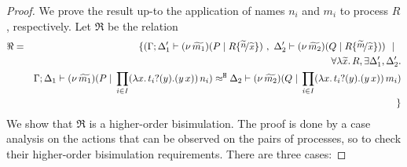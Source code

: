 \begin{proof}
	We prove the result up-to the application
	of names $n_i$ and $m_i$
	to process $R$, respectively.
	Let $\Re$ be the relation
	\begin{eqnarray*}
		\Re	&=&	\set{	(\horel{\Gamma}{\Delta_1'}{\newsp{\widetilde{m_1}}{P \Par R \subst{\widetilde{n}}{\widetilde{x}} }}
						{\ ,\ }
						{\Delta_2'}{\newsp{\widetilde{m_2}}{Q \Par R \subst{\widetilde{m}}{\widetilde{x}} }})
					\setbar\\
					&& \forall \abs{\widetilde{x}}{R}, \exists \Delta_1', \Delta_2'.\\
					&&	\horel{\Gamma}{\Delta_1}{\newsp{\widetilde{m_1}}{P \Par \prod_{i \in I} \appl{(\trvalx{t_i})}{n_i} }}
						{\hwb}
						{\Delta_2}{\newsp{\widetilde{m_2}}{Q \Par \prod_{i \in I} \appl{(\trvalx{t_i})}{m_i}}}\\
				&&}
	\end{eqnarray*}
	We show that $\Re$ is a higher-order bisimulation.
	The proof is done by a case analysis on the actions that can be observed
	on the pairs of processes, so to check their higher-order bisimulation requirements.
	There are three cases:


\end{proof}
